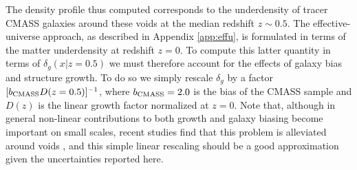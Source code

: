 \documentclass[twocolumn,amsfont,amssymb,amsmath, showpacs,balancelastpage, nofootinbib]{revtex4-1}
\begin{document}
      The density profile thus computed corresponds to the underdensity of tracer CMASS
      galaxies around these voids at the median redshift $z\sim0.5$. The effective-universe
      approach, as described in Appendix \ref{app:effu}, is formulated in terms of the
      matter underdensity at redshift $z=0$. To compute this latter quantity in terms
      of $\delta_g(x|z=0.5)$ we must therefore account for the effects of galaxy bias and
      structure growth. To do so we simply rescale $\delta_g$ by a factor
      $[b_{\rm CMASS}D(z=0.5)]^{-1}$, where $b_{\rm CMASS}=2.0$ is the bias of the CMASS
      sample \cite{2013MNRAS.432..743N} and $D(z)$ is the linear growth factor normalized
      at $z=0$. Note that, although in general non-linear contributions to both growth
      and galaxy biasing become important on small scales, recent studies find that this
      problem is alleviated around voids \cite{2017MNRAS.469..787P,2017JCAP...07..014H},
      and this simple linear rescaling should be a good approximation given the uncertainties
      reported here.
      
\end{document}
